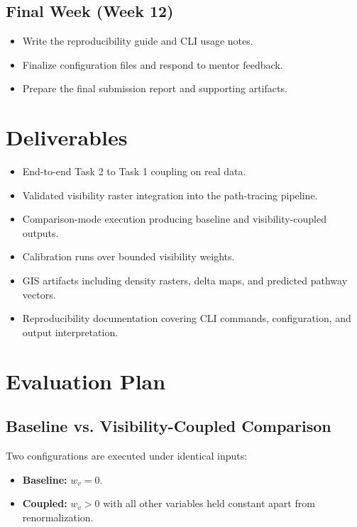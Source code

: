 \documentclass[11pt]{article}
\let\oldsection\section
\renewcommand{\section}{\clearpage\oldsection}
\begin{document}
\subsection{Final Week (Week 12)}

\begin{itemize}
  \item Write the reproducibility guide and CLI usage notes.
  \item Finalize configuration files and respond to mentor feedback.
  \item Prepare the final submission report and supporting artifacts.
\end{itemize}

\section{Deliverables}

\begin{itemize}
  \item End-to-end Task 2 to Task 1 coupling on real data.
  \item Validated visibility raster integration into the path-tracing pipeline.
  \item Comparison-mode execution producing baseline and visibility-coupled outputs.
  \item Calibration runs over bounded visibility weights.
  \item GIS artifacts including density rasters, delta maps, and predicted pathway vectors.
  \item Reproducibility documentation covering CLI commands, configuration, and output interpretation.
\end{itemize}

\section{Evaluation Plan}

\subsection{Baseline vs. Visibility-Coupled Comparison}

Two configurations are executed under identical inputs:

\begin{itemize}
  \item \textbf{Baseline:} $w_v = 0$.
  \item \textbf{Coupled:} $w_v > 0$ with all other variables held constant apart from renormalization.
\end{itemize}
\end{document}
